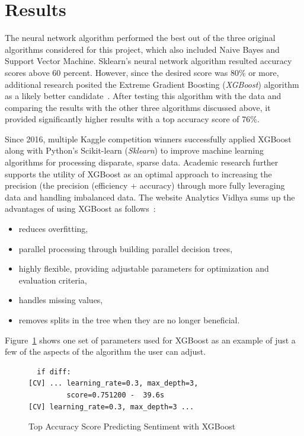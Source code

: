 \section{Results}

The neural network algorithm performed the best out of the three
original algorithms considered for this project, which also included
Naive Bayes and Support Vector Machine.  Sklearn's neural network
algorithm resulted accuracy scores above 60 percent.  However, since
the desired score was 80\% or more, additional research posited the
Extreme Gradient Boosting (\emph{XGBoost}) algorithm as a likely
better candidate~\cite{Chen2016,baba2016,phunter2016}.
After testing this algorithm with the data and comparing the results
with the other three algorithms discussed above, it provided
significantly higher results with a top accuracy score of 76\%.

Since 2016, multiple Kaggle competition winners successfully applied
XGBoost along with Python’s Scikit-learn (\emph{Sklearn}) to improve
machine learning algorithms for processing disparate, sparse data.
Academic research further supports the utility of XGBoost as an
optimal approach to increasing the precision (the precision
(efficiency + accuracy) through more fully leveraging data and
handling imbalanced data.  The website Analytics Vidhya sums up the
advantages of using XGBoost as follows~\cite{jain2016}:

\begin{itemize}
\item reduces overfitting,
\item parallel processing through building parallel decision trees,
\item highly flexible, providing adjustable parameters for
  optimization and evaluation criteria,
\item handles missing values,
\item removes splits in the tree when they are no longer beneficial. 
\end{itemize}

Figure~\ref{F:output} shows one set of parameters used for XGBoost as
an example of just a few of the aspects of the algorithm the user can
adjust.

\begin{figure}[H]
\begin{verbatim}
  if diff:
[CV] ... learning_rate=0.3, max_depth=3, 
         score=0.751200 -  39.6s
[CV] learning_rate=0.3, max_depth=3 ...
\end{verbatim}
\caption{Top Accuracy Score Predicting Sentiment with XGBoost}\label{F:output}
\end{figure}

